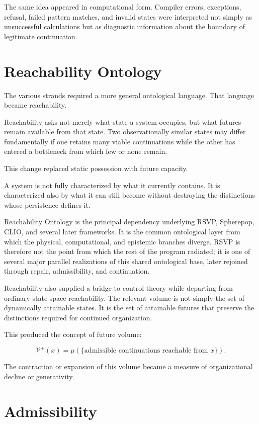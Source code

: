 \documentclass[11pt,oneside]{book}
\numberwithin{equation}{chapter}
\theoremstyle{definition}
\theoremstyle{plain}
\begin{document}
The same idea appeared in computational form. Compiler errors, exceptions,
refusal, failed pattern matches, and invalid states were interpreted not
simply as unsuccessful calculations but as diagnostic information about the
boundary of legitimate continuation.

\section{Reachability Ontology}

The various strands required a more general ontological language. That
language became reachability.

Reachability asks not merely what state a system occupies, but what futures
remain available from that state. Two observationally similar states may
differ fundamentally if one retains many viable continuations while the
other has entered a bottleneck from which few or none remain.

This change replaced static possession with future capacity.

A system is not fully characterized by what it currently contains. It is
characterized also by what it can still become without destroying the
distinctions whose persistence defines it.

Reachability Ontology is the principal dependency underlying RSVP,
Spherepop, CLIO, and several later frameworks. It is the common ontological
layer from which the physical, computational, and epistemic branches
diverge. RSVP is therefore not the point from which the rest of the program
radiated; it is one of several major parallel realizations of this shared
ontological base, later rejoined through repair, admissibility, and
continuation.

Reachability also supplied a bridge to control theory while departing from
ordinary state-space reachability. The relevant volume is not simply the
set of dynamically attainable states. It is the set of attainable futures
that preserve the distinctions required for continued organization.

This produced the concept of future volume:

\[
\mathcal V^+(x)
=
\mu\left(
\{\text{admissible continuations reachable from }x\}
\right).
\]

The contraction or expansion of this volume became a measure of
organizational decline or generativity.

\section{Admissibility}
\end{document}
